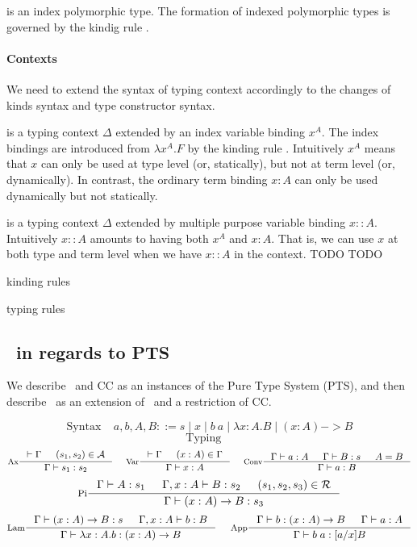  is an index polymorphic type. The formation of
indexed polymorphic types is governed by the kindig rule .

\paragraph{Contexts}
We need to extend the syntax of typing context accordingly to the changes
of kinds syntax and type constructor syntax.

 is a typing context $\Delta$ extended by
an index variable binding $x^A$. The index bindings are introduced from
$\lambda x^A.F$ by the kinding rule .
Intuitively $x^A$ means that $x$ can only be used at type level
(or, statically), but not at term level (or, dynamically).
In contrast, the ordinary term binding $x:A$ can only be used
dynamically but not statically.

 is a typing context $\Delta$ extended by
multiple purpose variable binding $x::A$. Intuitively $x::A$ amounts to
having both $x^A$ and $x:A$. That is, we can use $x$ at both type and
term level when we have $x::A$ in the context.
TODO
TODO

kinding rules

typing rules
\newFi{(::)}









\subsection{\Fi\ in regards to PTS}
We describe \Fw\ and CC as an instances of the Pure Type System (PTS),
and then describe \Fi\ as an extension of \Fw\ and a restriction of CC.

\[\text{Syntax}~~~~~ a,b,A,B ::= s \mid x \mid b~a \mid \lambda x:A.B
                                   \mid (x:A) -> B \]
\[\text{Typing}~~~~~\]
\[
 \inference[Ax]{|-\Gamma & (s_1,s_2)\in\calA}{\Gamma |- s_1 : s_2}
 ~~~~
 \inference[Var]{|-\Gamma & (x:A)\in\Gamma}{\Gamma |- x:A} 
 ~~~~
 \inference[Conv]{\Gamma |- a:A & \Gamma |- B:s & A=B}{\Gamma |- a:B}
\]
\[
 \inference[Pi]{\Gamma |- A:s_1 & \Gamma,x:A |- B:s_2 & (s_1,s_2,s_3)\in\calR}
               {\Gamma |- (x:A)-> B : s_3}
\]
\[
 \inference[Lam]{\Gamma |- (x:A)-> B : s & \Gamma,x:A |- b:B}
                {\Gamma |- \lambda x:A.b : (x:A)-> B}
 ~~~~
 \inference[App]{\Gamma |- b:(x:A)-> B & \Gamma |- a:A}{\Gamma |- b\;a:[a/x]B}
\]

